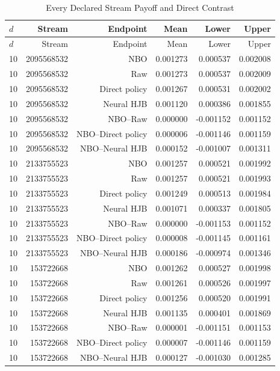 \begingroup\small
\begin{longtable}{lrrrrr}
\caption{Every Declared Stream Payoff and Direct Contrast}\label{tab:r15methodstreams}\\
\toprule
$d$ & Stream & Endpoint & Mean & Lower & Upper \\
\midrule
\endfirsthead
\toprule
$d$ & Stream & Endpoint & Mean & Lower & Upper \\
\midrule
\endhead
10 & 2095568532 & NBO & 0.001273 & 0.000537 & 0.002008 \\
10 & 2095568532 & Raw & 0.001273 & 0.000537 & 0.002009 \\
10 & 2095568532 & Direct policy & 0.001267 & 0.000531 & 0.002002 \\
10 & 2095568532 & Neural HJB & 0.001120 & 0.000386 & 0.001855 \\
10 & 2095568532 & NBO--Raw & 0.000000 & -0.001152 & 0.001152 \\
10 & 2095568532 & NBO--Direct policy & 0.000006 & -0.001146 & 0.001159 \\
10 & 2095568532 & NBO--Neural HJB & 0.000152 & -0.001007 & 0.001311 \\
10 & 2133755523 & NBO & 0.001257 & 0.000521 & 0.001992 \\
10 & 2133755523 & Raw & 0.001257 & 0.000521 & 0.001993 \\
10 & 2133755523 & Direct policy & 0.001249 & 0.000513 & 0.001984 \\
10 & 2133755523 & Neural HJB & 0.001071 & 0.000337 & 0.001805 \\
10 & 2133755523 & NBO--Raw & 0.000000 & -0.001153 & 0.001152 \\
10 & 2133755523 & NBO--Direct policy & 0.000008 & -0.001145 & 0.001161 \\
10 & 2133755523 & NBO--Neural HJB & 0.000186 & -0.000974 & 0.001346 \\
10 & 153722668 & NBO & 0.001262 & 0.000527 & 0.001998 \\
10 & 153722668 & Raw & 0.001261 & 0.000526 & 0.001997 \\
10 & 153722668 & Direct policy & 0.001256 & 0.000520 & 0.001991 \\
10 & 153722668 & Neural HJB & 0.001135 & 0.000401 & 0.001869 \\
10 & 153722668 & NBO--Raw & 0.000001 & -0.001151 & 0.001153 \\
10 & 153722668 & NBO--Direct policy & 0.000007 & -0.001146 & 0.001159 \\
10 & 153722668 & NBO--Neural HJB & 0.000127 & -0.001030 & 0.001285 \\

\end{longtable}

